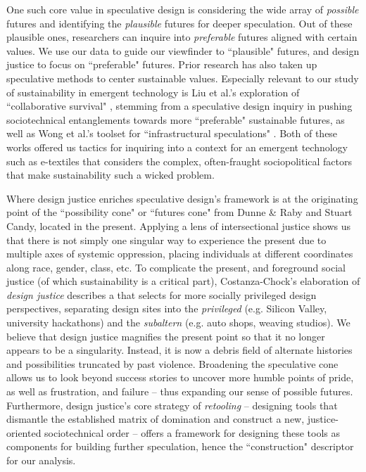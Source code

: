 One such core value in speculative design is considering the wide array of \textit{possible} futures and identifying the \textit{plausible} futures for deeper speculation. Out of these plausible ones, researchers can inquire into \textit{preferable} futures aligned with certain values. We use our data to guide our viewfinder to ``plausible" futures, and design justice to focus on ``preferable" futures.
Prior research has also taken up speculative methods to center sustainable values. Especially relevant to our study of sustainability in emergent technology is Liu et al.'s exploration of ``collaborative survival" \cite{liu_design_2018}, stemming from a speculative design inquiry in pushing sociotechnical entanglements towards more ``preferable" sustainable futures, as well as Wong et al.'s toolset for ``infrastructural speculations" \cite{wong_infrastructural_2020}. Both of these works offered us tactics for inquiring into a context for an emergent technology such as e-textiles that considers the complex, often-fraught sociopolitical factors that make sustainability such a wicked problem. 

Where design justice enriches speculative design's framework is at the originating point of %
the ``possibility cone" or ``futures cone" from Dunne \& Raby and Stuart Candy\cite{dunne_speculative_2013}, located in the present. Applying a lens of intersectional justice shows us that there is not simply one singular way to experience the present due to multiple axes of systemic oppression, placing individuals at different coordinates along race, gender, class, etc. To complicate the present, and foreground social justice (of which sustainability is a critical part), Costanza-Chock's elaboration of \textit{design justice} \cite{costanza-chock_design_2020} describes a  that selects for more socially privileged design perspectives, separating design sites into the \textit{privileged} (e.g. Silicon Valley, university hackathons) and the \textit{subaltern} (e.g. auto shops, weaving studios). We believe that design justice magnifies the present point so that it no longer appears to be a singularity. Instead, it is now a debris field of alternate histories and possibilities truncated by past violence.
Broadening the speculative cone allows us to look beyond success stories to uncover more humble points of pride, as well as frustration, and failure -- thus expanding our sense of possible futures. Furthermore, design justice's core strategy of \textit{retooling} -- designing tools that dismantle the established matrix of domination and construct a new, justice-oriented sociotechnical order -- offers a framework for designing these tools as components for building further speculation, hence the ``construction" descriptor for our analysis.




